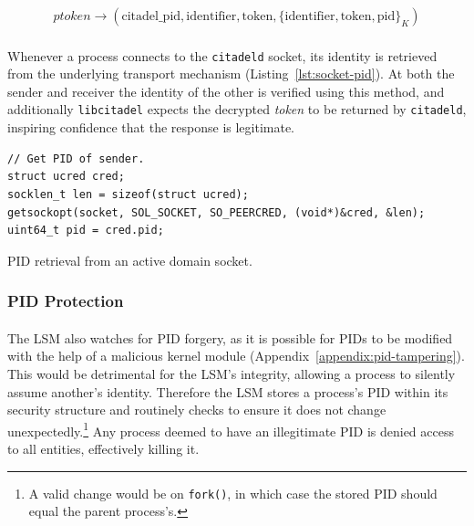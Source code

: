 \vspace{-7mm}
\begin{align}
    \textit{ptoken} \rightarrow ( \text{citadel\_pid}, \text{identifier}, \text{token}, \{\text{identifier}, \text{token}, \text{pid}\}_K) \label{eqn:ptoken}
\end{align}

\paragraph{} Whenever a process connects to the \texttt{citadeld} socket, its identity is retrieved from the underlying transport mechanism (Listing~\ref{lst:socket-pid}). At both the sender and receiver the identity of the other is verified using this method, and additionally \texttt{libcitadel} expects the decrypted \textit{token} to be returned by \texttt{citadeld}, inspiring confidence that the response is legitimate.

\begin{listing}
\begin{verbatim}
// Get PID of sender.
struct ucred cred;
socklen_t len = sizeof(struct ucred);
getsockopt(socket, SOL_SOCKET, SO_PEERCRED, (void*)&cred, &len);
uint64_t pid = cred.pid;
\end{verbatim}
\vspace{3mm}
\caption{PID retrieval from an active domain socket.}
\label{lst:socket-pid}
\end{listing}

\subsubsection{PID Protection}
\label{sec:pid-protection}
\paragraph{} The LSM also watches for PID forgery, as it is possible for PIDs to be modified with the help of a malicious kernel module (Appendix~\ref{appendix:pid-tampering}). This would be detrimental for the LSM's integrity, allowing a process to silently assume another's identity. Therefore the LSM stores a process's PID within its security structure and routinely checks to ensure it does not change unexpectedly.\footnote{A valid change would be on \texttt{fork()}, in which case the stored PID should equal the parent process's.} Any process deemed to have an illegitimate PID is denied access to all entities, effectively killing it.

